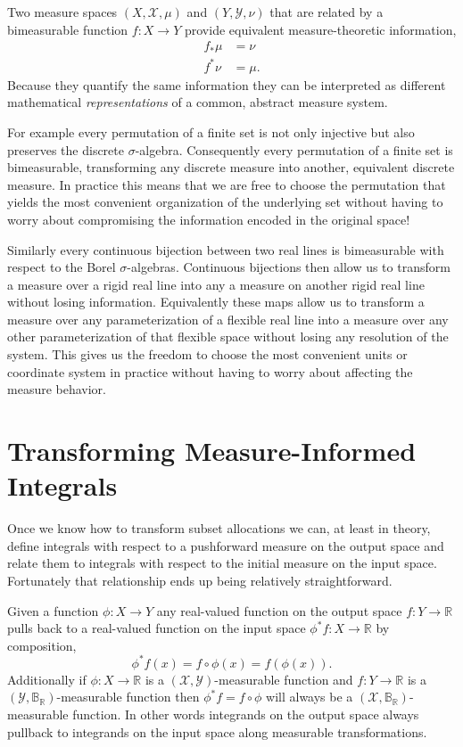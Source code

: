 \documentclass[
  letterpaper,
  DIV=11,
  numbers=noendperiod]{scrartcl}
\begin{document}
Two measure spaces \((X, \mathcal{X}, \mu)\) and
\((Y, \mathcal{Y}, \nu)\) that are related by a bimeasurable function
\(f : X \rightarrow Y\) provide equivalent measure-theoretic
information, \begin{align*}
f_{*} \mu &= \nu
\\
f^{*} \nu &= \mu.
\end{align*} Because they quantify the same information they can be
interpreted as different mathematical \emph{representations} of a
common, abstract measure system.

For example every permutation of a finite set is not only injective but
also preserves the discrete \(\sigma\)-algebra. Consequently every
permutation of a finite set is bimeasurable, transforming any discrete
measure into another, equivalent discrete measure. In practice this
means that we are free to choose the permutation that yields the most
convenient organization of the underlying set without having to worry
about compromising the information encoded in the original space!

Similarly every continuous bijection between two real lines is
bimeasurable with respect to the Borel \(\sigma\)-algebras. Continuous
bijections then allow us to transform a measure over a rigid real line
into any a measure on another rigid real line without losing
information. Equivalently these maps allow us to transform a measure
over any parameterization of a flexible real line into a measure over
any other parameterization of that flexible space without losing any
resolution of the system. This gives us the freedom to choose the most
convenient units or coordinate system in practice without having to
worry about affecting the measure behavior.

\hypertarget{sec:transforming-integrals}{%
\section{Transforming Measure-Informed
Integrals}\label{sec:transforming-integrals}}

Once we know how to transform subset allocations we can, at least in
theory, define integrals with respect to a pushforward measure on the
output space and relate them to integrals with respect to the initial
measure on the input space. Fortunately that relationship ends up being
relatively straightforward.

Given a function \(\phi : X \rightarrow Y\) any real-valued function on
the output space \(f : Y \rightarrow \mathbb{R}\) pulls back to a
real-valued function on the input space
\(\phi^{*} f : X \rightarrow \mathbb{R}\) by composition, \[
\phi^{*} f(x) = f \circ \phi (x) = f(\phi(x)).
\] Additionally if \(\phi : X \rightarrow \mathbb{R}\) is a
\((\mathcal{X}, \mathcal{Y})\)-measurable function and
\(f : Y \rightarrow \mathbb{R}\) is a
\((\mathcal{Y}, \mathbb{B}_{\mathbb{R}})\)-measurable function then
\(\phi^{*} f = f \circ \phi\) will always be a
\((\mathcal{X}, \mathbb{B}_{\mathbb{R}})\)-measurable function. In other
words integrands on the output space always pullback to integrands on
the input space along measurable transformations.
\end{document}
